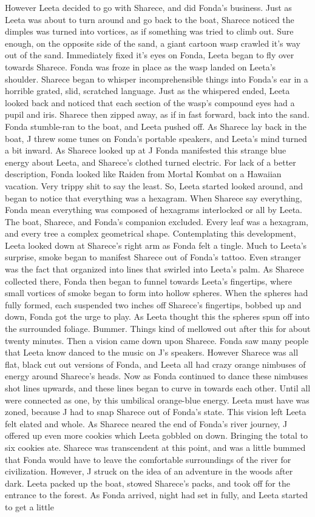 \documentclass[12pt]{book}
\begin{document}
However Leeta decided to go with Sharece, and did Fonda's business. Just as Leeta was about to turn around and go back to the boat, Sharece noticed the dimples was turned into vortices, as if something was tried to climb out. Sure enough, on the opposite side of the sand, a giant cartoon wasp crawled it's way out of the sand. Immediately fixed it's eyes on Fonda, Leeta began to fly over towards Sharece. Fonda was froze in place as the wasp landed on Leeta's shoulder. Sharece began to whisper incomprehensible things into Fonda's ear in a horrible grated, slid, scratched language. Just as the whispered ended, Leeta looked back and noticed that each section of the wasp's compound eyes had a pupil and iris. Sharece then zipped away, as if in fast forward, back into the sand. Fonda stumble-ran to the boat, and Leeta pushed off. As Sharece lay back in the boat, J threw some tunes on Fonda's portable speakers, and Leeta's mind turned a bit inward. As Sharece looked up at J Fonda manifested this strange blue energy about Leeta, and Sharece's clothed turned electric. For lack of a better description, Fonda looked like Raiden from Mortal Kombat on a Hawaiian vacation. Very trippy shit to say the least. So, Leeta started looked around, and began to notice that everything was a hexagram. When Sharece say everything, Fonda mean everything was composed of hexagrams interlocked or all by Leeta. The boat, Sharece, and Fonda's companion excluded. Every leaf was a hexagram, and every tree a complex geometrical shape. Contemplating this development, Leeta looked down at Sharece's right arm as Fonda felt a tingle. Much to Leeta's surprise, smoke began to manifest Sharece out of Fonda's tattoo. Even stranger was the fact that organized into lines that swirled into Leeta's palm. As Sharece collected there, Fonda then began to funnel towards Leeta's fingertips, where small vortices of smoke began to form into hollow spheres. When the spheres had fully formed, each suspended two inches off Sharece's fingertips, bobbed up and down, Fonda got the urge to play. As Leeta thought this the spheres spun off into the surrounded foliage. Bummer. Things kind of mellowed out after this for about twenty minutes. Then a vision came down upon Sharece. Fonda saw many people that Leeta know danced to the music on J's speakers. However Sharece was all flat, black cut out versions of Fonda, and Leeta all had crazy orange nimbuses of energy around Sharece's heads. Now as Fonda continued to dance these nimbuses shot lines upwards, and these lines began to curve in towards each other. Until all were connected as one, by this umbilical orange-blue energy. Leeta must have was zoned, because J had to snap Sharece out of Fonda's state. This vision left Leeta felt elated and whole. As Sharece neared the end of Fonda's river journey, J offered up even more cookies which Leeta gobbled on down. Bringing the total to six cookies ate. Sharece was transcendent at this point, and was a little bummed that Fonda would have to leave the comfortable surroundings of the river for civilization. However, J struck on the idea of an adventure in the woods after dark. Leeta packed up the boat, stowed Sharece's packs, and took off for the entrance to the forest. As Fonda arrived, night had set in fully, and Leeta started to get a little 
\end{document}

